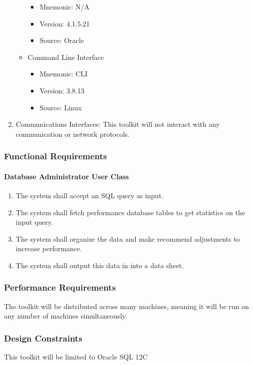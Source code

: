 \documentclass[draftclsnofoot, onecolumn, compsoc, 10pt]{IEEEtran}
\begin{document}
\begin{enumerate}
\begin{itemize}
	 \begin{itemize}
		\item Mnemonic: N/A
        \item Version: 4.1.5.21
        \item Source: Oracle
     \end{itemize}
     \item Command Line Interface
	 \begin{itemize}
		\item Mnemonic: CLI
        \item Version: 3.8.13
        \item Source: Linux
	 \end{itemize}
	 \end{itemize}
     \item Communications Interfaces: This toolkit will not interact with any communication or network protocols.
\end{enumerate}

\subsubsection{Functional Requirements}

\paragraph{Database Administrator User Class}
\begin{enumerate}
  \item The system shall accept an SQL query as input.
  \item The system shall fetch performance database tables to get statistics on the input query.
  \item The system shall organize the data and make recommend adjustments to increase performance.
  \item The system shall output this data in into a data sheet.
\end{enumerate}

\subsubsection{Performance Requirements}
The toolkit will be distributed across many machines, meaning it will be run on any number of machines simultaneously.

\subsubsection{Design Constraints}
This toolkit will be limited to Oracle SQL 12C
\end{document}
